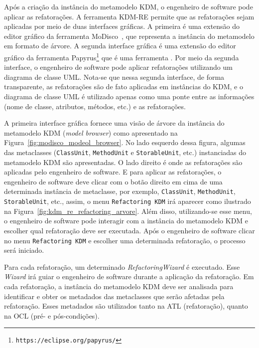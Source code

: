 Após a criação da instância do metamodelo KDM, o engenheiro de software pode aplicar as refatorações. A ferramenta KDM-RE permite que as refatorações sejam aplicadas por meio de duas interfaces gráficas. A primeira é uma extensão do editor gráfico da ferramenta MoDisco~\cite{Bruneliere_2014}, que representa a instância do metamodelo em formato de árvore. A segunda interface gráfica é uma extensão do editor gráfico da ferramenta Papyrus\footnote{\texttt{https://eclipse.org/papyrus/}} que é uma ferramenta . Por meio da segunda interface, o engenheiro de software pode aplicar refatorações utilizando um diagrama de classe UML. Nota-se que nessa segunda interface, de forma transparente, as refatorações são de fato aplicadas em instâncias do KDM, e o diagrama de classe UML é utilizado apenas como uma ponte entre as informações (nome de classe, atributos, métodos, etc.) e as refatorações.

A primeira interface gráfica fornece uma visão de árvore da instância do metamodelo KDM (\textit{model browser}) como apresentado na Figura~\ref{fig:modisco_modeol_browser}. No lado esquerdo dessa figura, algumas das metaclasses (\texttt{ClassUnit}, \texttt{MethodUnit} e \texttt{StorableUnit}, etc.) instanciadas do metamodelo KDM são apresentadas. O lado direito é onde as refatorações são aplicadas pelo engenheiro de software. E para aplicar as refatorações, o engenheiro de software deve clicar com o botão direito em cima de uma determinada instância de metaclasse, por exemplo, \texttt{ClassUnit}, \texttt{MethodUnit}, \texttt{StorableUnit}, etc., assim, o menu \texttt{Refactoring KDM} irá aparecer como ilustrado na Figura~\ref{fig:kdm_re_refactoring_arvore}. Além disso, utilizando-se esse menu, o engenheiro de software pode interagir com a instância do metamodelo KDM e escolher qual refatoração deve ser executada. Após o engenheiro de software clicar no menu \texttt{Refactoring KDM} e escolher uma determinada refatoração, o processo será iniciado. 

Para cada refatoração, um determinado \textit{RefactoringWizard} é executado. Esse \textit{Wizard} irá guiar o engenheiro de software durante a aplicação da refatoração. Em cada refatoração, a instância do metamodelo KDM deve ser analisada para identificar e obter os metadados das metaclasses que serão afetadas pela refatoração. Esses metadados são utilizados tanto na ATL (refatoração), quanto na OCL (pré- e pós-condições). 


